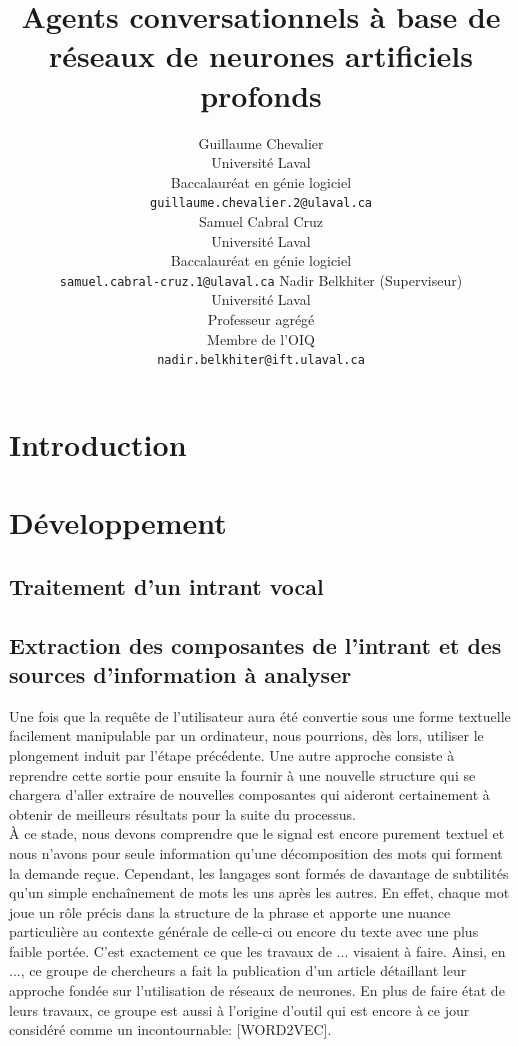 \documentclass[11pt]{article}
\title{Agents conversationnels à base de réseaux de neurones artificiels profonds}
\author{Guillaume Chevalier \\
  Université Laval \\ Baccalauréat en génie logiciel \\
  {\tt \small guillaume.chevalier.2@ulaval.ca} \\\And
  Samuel Cabral Cruz \\
  Université Laval \\ Baccalauréat en génie logiciel \\
  {\tt \small samuel.cabral-cruz.1@ulaval.ca} \And
  Nadir Belkhiter (Superviseur) \\
  Université Laval \\ Professeur agrégé \\
  Membre de l’OIQ \\
  {\tt \small nadir.belkhiter@ift.ulaval.ca}}
\date{}
\begin{document}
\maketitle

\begin{abstract}

\end{abstract}

\section{Introduction}


\section{Développement}
\subsection{Traitement d'un intrant vocal}

\subsection{Extraction des composantes de l'intrant et des sources d'information à analyser}
Une fois que la requête de l'utilisateur aura été convertie sous une forme textuelle facilement manipulable par un ordinateur, nous pourrions, dès lors, utiliser le plongement induit par l'étape précédente. Une autre approche consiste à reprendre cette sortie pour ensuite la fournir à une nouvelle structure qui se chargera d'aller extraire de nouvelles composantes qui aideront certainement à obtenir de meilleurs résultats pour la suite du processus. \\

À ce stade, nous devons comprendre que le signal est encore purement textuel et nous n'avons pour seule information qu'une décomposition des mots qui forment la demande reçue. Cependant, les langages sont formés de davantage de subtilités qu'un simple enchaînement de mots les uns après les autres. En effet, chaque mot joue un rôle précis dans la structure de la phrase et apporte une nuance particulière au contexte générale de celle-ci ou encore du texte avec une plus faible portée. C'est exactement ce que les travaux de ... visaient à faire. Ainsi, en ..., ce groupe de chercheurs a fait la publication d'un article détaillant leur approche fondée sur l'utilisation de réseaux de neurones. En plus de faire état de leurs travaux, ce groupe est aussi à l'origine d'outil qui est encore à ce jour considéré comme un incontournable: [WORD2VEC]. \\
\end{document}
